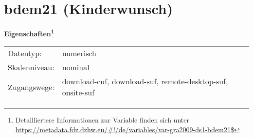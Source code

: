 
    \setcounter{footnote}{0}

    \vspace*{-1.8cm}
	\section{bdem21 (Kinderwunsch)}
	\label{section:bdem21}



    \vspace*{0.5cm}
    \noindent\textbf{Eigenschaften\footnote{Detailliertere Informationen zur Variable finden sich unter
		\url{https://metadata.fdz.dzhw.eu/\#!/de/variables/var-gra2009-ds1-bdem21$}}}\\
	\begin{tabularx}{\hsize}{@{}lX}
	Datentyp: & numerisch \\
	Skalenniveau: & nominal \\
	Zugangswege: &
	  download-cuf, 
	  download-suf, 
	  remote-desktop-suf, 
	  onsite-suf
 \\
    \end{tabularx}



